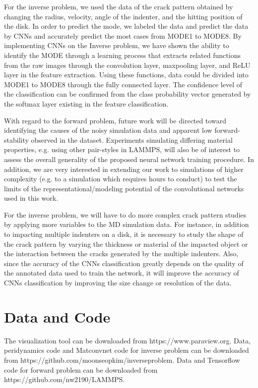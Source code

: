 For the inverse problem, we used the data of the crack pattern obtained by changing the radius, velocity, angle of the indenter, and the hitting position of the disk. In order to predict the mode, we labeled the data and predict the data by CNNs and accurately predict the most cases from MODE1 to MODE8. By implementing CNNs on the Inverse problem, we have shown the ability to identify the MODE through a learning process that extracts related functions from the raw images through the convolution layer, maxpooling layer, and ReLU layer in the feature extraction. Using these functions, data could be divided into MODE1 to MODE8 through the fully connected layer. The confidence level of the classification can be confirmed from the class probability vector generated by the softmax layer existing in the feature classification. 

With regard to the forward problem, future work will be directed toward identifying the causes of the noisy simulation data and apparent low forward-stability observed in the dataset.  Experiments simulating differing material properties, e.g. using other pair-styles in LAMMPS, will also be of interest to assess the overall generality of the proposed neural network training procedure.  In addition, we are very interested in extending our work to simulations of higher complexity (e.g. to a simulation which requires hours to conduct) to test the limits of the representational/modeling potential of the convolutional networks used in this work.

For the inverse problem, we will have to do more complex crack pattern studies by applying more variables to the MD simulation data. For instance, in addition to impacting multiple indenters on a disk, it is necessary to study the shape of the crack pattern by varying the thickness or material of the impacted object or the interaction between the cracks generated by the multiple indenters. Also, since the accuracy of the CNNs classification greatly depends on the quality of the annotated data used to train the network, it will improve the accuracy of CNNs classification by improving the size change or resolution of the data. 


\section{Data and Code}
\label{sec:6}

The visualization tool can be downloaded from https://www.paraview.org. Data, peridynamics code and Matconvnet code for inverse problem can be downloaded from https://github.com/moonseopkim/inverseproblem.
Data and Tensorflow code for forward problem can be downloaded from https://github.com/nw2190/LAMMPS.

